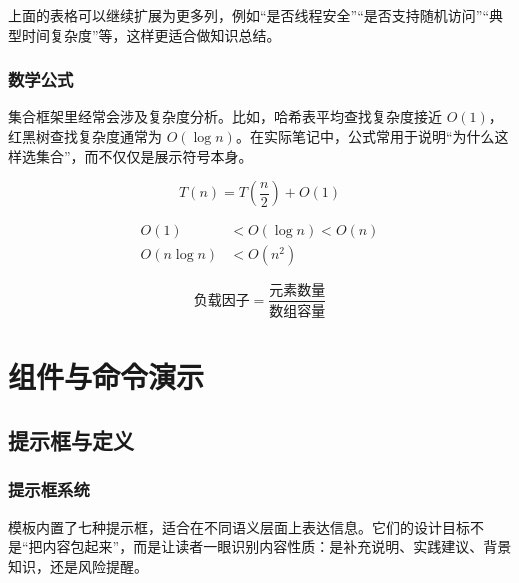 \documentclass{computer-notes}
\begin{document}
上面的表格可以继续扩展为更多列，例如“是否线程安全”“是否支持随机访问”“典型时间复杂度”等，这样更适合做知识总结。

\section{数学公式}
集合框架里经常会涉及复杂度分析。比如，哈希表平均查找复杂度接近 $O(1)$，红黑树查找复杂度通常为 $O(\log n)$。在实际笔记中，公式常用于说明“为什么这样选集合”，而不仅仅是展示符号本身。

\begin{equation}
  T(n) = T\left(\frac{n}{2}\right) + O(1)
\end{equation}

\begin{align}
  O(1) &< O(\log n) < O(n) \\
  O(n \log n) &< O(n^2)
\end{align}

\begin{equation*}
  \text{负载因子} = \frac{\text{元素数量}}{\text{数组容量}}
\end{equation*}

\part{组件与命令演示}

\chapter{提示框与定义}

\section{提示框系统}
模板内置了七种提示框，适合在不同语义层面上表达信息。它们的设计目标不是“把内容包起来”，而是让读者一眼识别内容性质：是补充说明、实践建议、背景知识，还是风险提醒。






\end{document}
